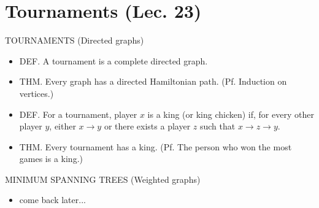 \documentclass[../m55main.tex]{chapters}
\begin{document}
\section{Tournaments (Lec. 23)}
TOURNAMENTS (Directed graphs)
\begin{itemize}
    \item DEF. A tournament is a complete directed graph.
    \item THM. Every graph has a directed Hamiltonian path. (Pf. Induction on vertices.)
    \item DEF. For a tournament, player $x$ is a king (or king chicken) if, for every other player $y$, either $x \to y$ or there exists a player $z$ such that $x \to z \to y$.
    \item THM. Every tournament has a king. (Pf. The person who won the most games is a king.)
\end{itemize}
MINIMUM SPANNING TREES (Weighted graphs)
\begin{itemize}
    \item come back later...
\end{itemize}
\end{document}
